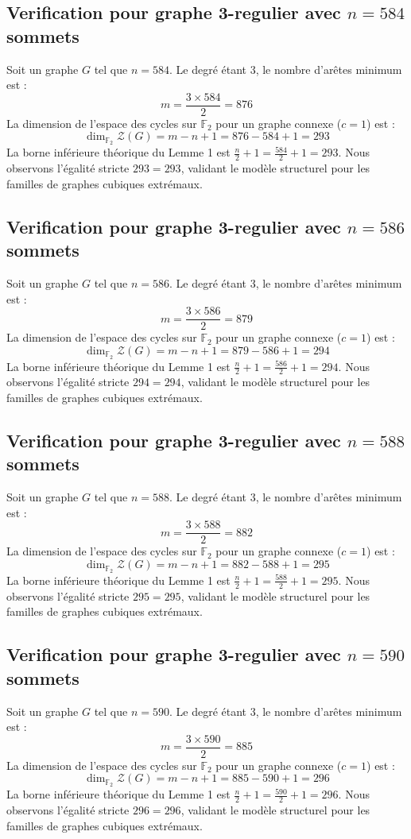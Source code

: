 \documentclass[11pt,a4paper]{article}
\begin{document}
\subsection{Verification pour graphe 3-regulier avec $n=584$ sommets}
Soit un graphe $G$ tel que $n = 584$. Le degré étant 3, le nombre d'arêtes minimum est :
$$ m = \frac{3 \times 584}{2} = 876 $$
La dimension de l'espace des cycles sur $\mathbb{F}_2$ pour un graphe connexe ($c=1$) est :
$$ \dim_{\mathbb{F}_2} \mathcal{Z}(G) = m - n + 1 = 876 - 584 + 1 = 293 $$
La borne inférieure théorique du Lemme 1 est $\frac{n}{2} + 1 = \frac{584}{2} + 1 = 293$.
Nous observons l'égalité stricte $293 = 293$, validant le modèle structurel pour les familles de graphes cubiques extrémaux.

\subsection{Verification pour graphe 3-regulier avec $n=586$ sommets}
Soit un graphe $G$ tel que $n = 586$. Le degré étant 3, le nombre d'arêtes minimum est :
$$ m = \frac{3 \times 586}{2} = 879 $$
La dimension de l'espace des cycles sur $\mathbb{F}_2$ pour un graphe connexe ($c=1$) est :
$$ \dim_{\mathbb{F}_2} \mathcal{Z}(G) = m - n + 1 = 879 - 586 + 1 = 294 $$
La borne inférieure théorique du Lemme 1 est $\frac{n}{2} + 1 = \frac{586}{2} + 1 = 294$.
Nous observons l'égalité stricte $294 = 294$, validant le modèle structurel pour les familles de graphes cubiques extrémaux.

\subsection{Verification pour graphe 3-regulier avec $n=588$ sommets}
Soit un graphe $G$ tel que $n = 588$. Le degré étant 3, le nombre d'arêtes minimum est :
$$ m = \frac{3 \times 588}{2} = 882 $$
La dimension de l'espace des cycles sur $\mathbb{F}_2$ pour un graphe connexe ($c=1$) est :
$$ \dim_{\mathbb{F}_2} \mathcal{Z}(G) = m - n + 1 = 882 - 588 + 1 = 295 $$
La borne inférieure théorique du Lemme 1 est $\frac{n}{2} + 1 = \frac{588}{2} + 1 = 295$.
Nous observons l'égalité stricte $295 = 295$, validant le modèle structurel pour les familles de graphes cubiques extrémaux.

\subsection{Verification pour graphe 3-regulier avec $n=590$ sommets}
Soit un graphe $G$ tel que $n = 590$. Le degré étant 3, le nombre d'arêtes minimum est :
$$ m = \frac{3 \times 590}{2} = 885 $$
La dimension de l'espace des cycles sur $\mathbb{F}_2$ pour un graphe connexe ($c=1$) est :
$$ \dim_{\mathbb{F}_2} \mathcal{Z}(G) = m - n + 1 = 885 - 590 + 1 = 296 $$
La borne inférieure théorique du Lemme 1 est $\frac{n}{2} + 1 = \frac{590}{2} + 1 = 296$.
Nous observons l'égalité stricte $296 = 296$, validant le modèle structurel pour les familles de graphes cubiques extrémaux.
\end{document}
